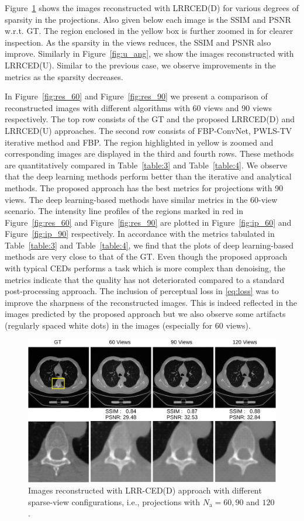 Figure~\ref{fig:d_ang} shows the images reconstructed with \ac{LRRCED}(D) for various degrees of sparsity in the projections. Also given below each image is the \ac{SSIM} and \ac{PSNR} w.r.t. \ac{GT}. The region enclosed in the yellow box is further zoomed in for clearer inspection. As the sparsity in the views reduces, the \ac{SSIM} and \ac{PSNR} also improve. Similarly in Figure~\ref{fig:u_ang}, we show the images reconstructed with \ac{LRRCED}(U). Similar to the previous case, we observe improvements in the metrics as the sparsity decreases. 

In Figure~\ref{fig:res_60} and Figure~\ref{fig:res_90} we present a comparison of reconstructed images with different algorithms with 60 views and 90 views respectively. The top row consists of the \ac{GT} and the proposed \ac{LRRCED}(D) and \ac{LRRCED}(U) approaches. The second row consists of FBP-ConvNet, \ac{PWLS}-\ac{TV} iterative method and \ac{FBP}. The region highlighted in yellow is zoomed and corresponding images are displayed in the third and fourth rows. These methods are quantitatively compared in Table~\ref{table:3} and Table~\ref{table:4}. We observe that the deep learning methods perform better than the iterative and analytical methods. The proposed approach has the best metrics for projections with 90 views. The deep learning-based methods have similar metrics in the 60-view scenario. The intensity line profiles of the regions marked in red in Figure~\ref{fig:res_60} and Figure~\ref{fig:res_90} are plotted in Figure~\ref{fig:ip_60} and Figure~\ref{fig:ip_90} respectively. In accordance with the metrics tabulated in Table~\ref{table:3} and Table~\ref{table:4}, we find that the plots of deep learning-based methods are very close to that of the \ac{GT}. Even though the proposed approach with typical \acp{CED} performs a task which is more complex than denoising, the metrics indicate that the quality has not deteriorated compared to a standard post-processing approach. The inclusion of perceptual loss in \ref{eq:loss} was to improve the sharpness of the reconstructed images. This is indeed reflected in the images predicted by the proposed approach but we also observe some artifacts (regularly spaced white dots) in the images (especially for 60 views).

\begin{figure}[!htbp]
	\centering
	\includegraphics[width=0.8\linewidth]{./Figures/views_dense-crop.pdf}
	\caption{Images reconstructed with LRR-CED(D) approach with different sparse-view configurations, i.e., projections with $N_\mathrm{a}=60,90$ and $120$.}
	\label{fig:d_ang}
\end{figure}


